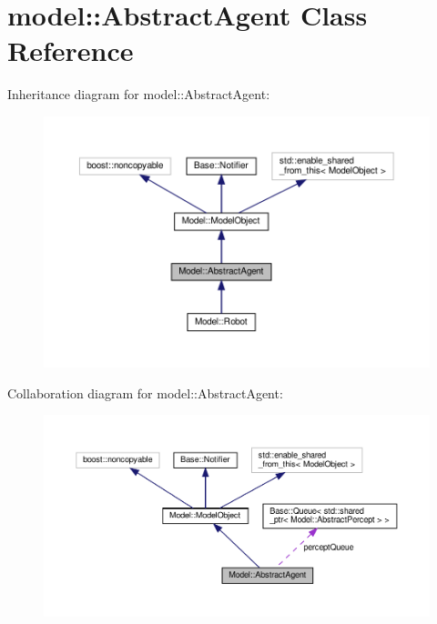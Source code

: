 \hypertarget{class_model_1_1_abstract_agent}{}\section{model\+:\+:Abstract\+Agent Class Reference}
\label{class_model_1_1_abstract_agent}


Inheritance diagram for model\+:\+:Abstract\+Agent\+:
\nopagebreak
\begin{figure}[H]
\begin{center}
\leavevmode
\includegraphics[width=350pt]{class_model_1_1_abstract_agent__inherit__graph}
\end{center}
\end{figure}


Collaboration diagram for model\+:\+:Abstract\+Agent\+:
\nopagebreak
\begin{figure}[H]
\begin{center}
\leavevmode
\includegraphics[width=350pt]{class_model_1_1_abstract_agent__coll__graph}
\end{center}
\end{figure}
